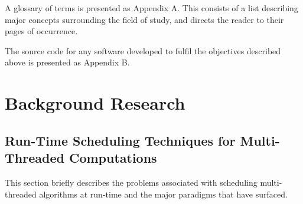 A glossary of terms is presented as Appendix A. 
This consists of a list describing major concepts surrounding the field of study, and directs the reader to their pages of occurrence. 

The source code for any software developed to fulfil the objectives described above is presented as Appendix B.







\chapter{Background Research}

\section{Run-Time Scheduling Techniques for Multi-Threaded Computations}
This section briefly describes the problems associated with \gls{scheduling} \glspl{multi-threaded algorithm} at run-time and
the major paradigms that have surfaced.

